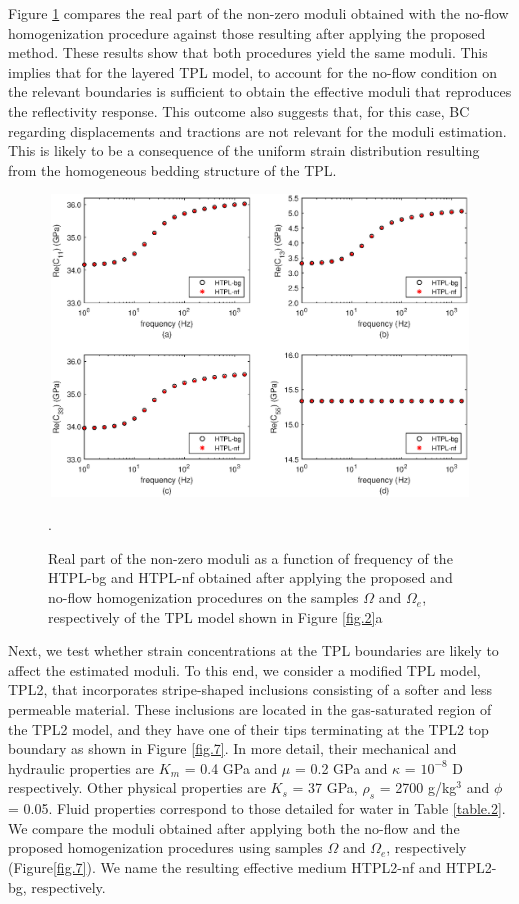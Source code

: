 \documentclass[draft]{agujournal2019}
\begin{document}
Figure \ref{fig.6} compares the real part of the non-zero moduli obtained with the no-flow homogenization procedure against those resulting after applying the proposed method. These results show that both procedures yield the same moduli. This implies that for the layered TPL model, to account for the no-flow condition on the relevant boundaries is sufficient to obtain the  effective moduli that reproduces the reflectivity response. This outcome also suggests that, for this case, BC regarding displacements and tractions are not relevant for the moduli estimation. This is likely to be a consequence of the uniform strain distribution resulting from the homogeneous bedding structure of the TPL. 

\begin{figure}[!ht]
\centering
        \includegraphics[width= 120mm, height=80mm]{cijnf_2sandshale.eps}
\caption{Real part of the non-zero moduli as a function of frequency of the HTPL-bg and HTPL-nf obtained after applying the proposed and no-flow homogenization procedures on the samples $\Omega$ and $\Omega_e$, respectively of the TPL model shown in Figure \ref{fig.2}a}. 
\label{fig.6}
\end{figure}

Next, we test whether strain concentrations at the TPL boundaries are likely to affect the estimated moduli. To this end, we consider a modified TPL model, TPL2, that incorporates stripe-shaped inclusions consisting of a softer and less permeable material. These inclusions are located in the gas-saturated region of the TPL2 model, and they have one of their tips terminating at the TPL2 top boundary as shown in Figure \ref{fig.7}. In more detail, their mechanical and hydraulic properties are $K_m$ = 0.4 GPa and  $\mu$ = 0.2 GPa  and $\kappa$ = $10^{-8}$ D respectively. Other physical properties are $K_s$ = 37 GPa, $\rho_s$ = 2700 g/kg$^3$ and $\phi$ = 0.05. Fluid properties correspond to those detailed for water in Table \ref{table.2}. We compare the moduli obtained after applying  both the no-flow and the proposed homogenization procedures using samples $\Omega$ and $\Omega_e$, respectively (Figure\ref{fig.7}). We name the resulting effective medium HTPL2-nf  and HTPL2-bg, respectively.
\end{document}
